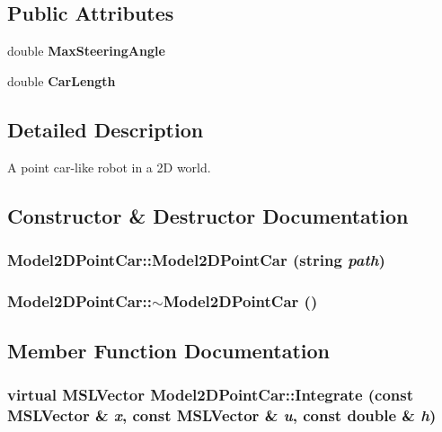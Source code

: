 \subsection*{Public Attributes}
\begin{CompactItemize}
\item 
double {\bf Max\-Steering\-Angle}
\item 
double {\bf Car\-Length}
\end{CompactItemize}


\subsection{Detailed Description}
A point car-like robot in a 2D world.



\subsection{Constructor \& Destructor Documentation}
\subsubsection{\setlength{\rightskip}{0pt plus 5cm}Model2DPoint\-Car::Model2DPoint\-Car (string {\em path})}\label{class_Model2DPointCar_a0}


\subsubsection{\setlength{\rightskip}{0pt plus 5cm}Model2DPoint\-Car::$\sim$Model2DPoint\-Car ()\hspace{0.3cm}{\tt  [inline, virtual]}}\label{class_Model2DPointCar_a1}




\subsection{Member Function Documentation}
\subsubsection{\setlength{\rightskip}{0pt plus 5cm}virtual {\bf MSLVector} Model2DPoint\-Car::Integrate (const {\bf MSLVector} \& {\em x}, const {\bf MSLVector} \& {\em u}, const double \& {\em h})\hspace{0.3cm}{\tt  [virtual]}}\label{class_Model2DPointCar_a2}


